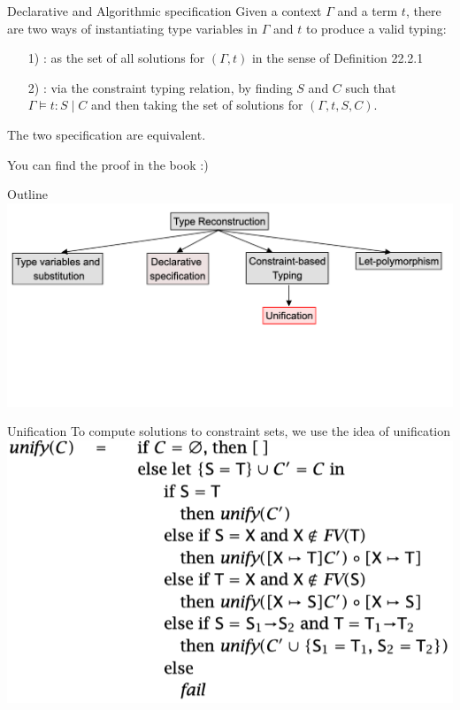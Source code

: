 \documentclass[usenames,dvipsnames]{beamer}
\begin{document}
\begin{frame}{Declarative and Algorithmic specification}
Given a context $\Gamma$ and a term $t$, there are two ways of instantiating type variables in $\Gamma$ and $t$ to produce a valid typing:

\vspace{0.5cm}
\begin{enumerate}
\item[1)] \emphColorSlide{[Declarative]}: as the set of all solutions for $(\Gamma,t)$ in the sense of Definition 22.2.1
\item[2)] \emphColorSlide{[Algorithmic]}: via the constraint typing relation, by finding $S$ and $C$ such that $\Gamma \models t: S\mid C$ and then taking the set of solutions for $(\Gamma, t, S,C)$.
\end{enumerate}

\vspace{.5cm}
The two specification are equivalent.

\vspace{.5cm}
You can find the proof in the book :)

\end{frame}

\begin{frame}{Outline}
\includegraphics[scale=0.25]{img/5}
\end{frame}

\begin{frame}{Unification}
To compute solutions to constraint sets, we use the idea of unification\\
\vspace{0.5cm}
\includegraphics[scale=0.4]{img/unification}
\end{frame}
\end{document}
